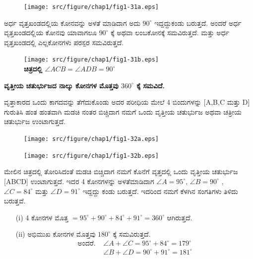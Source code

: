 \begin{itemize}
\newpage  
  
\begin{figure}[H]
\centering
\texttt{[image: src/figure/chap1/fig1-31a.eps]}
\end{figure}
 
 ಅರ್ಧ  ವೃತ್ತಖಂಡದಲ್ಲಿಯ ಕೋನವನ್ನು ಅಳತೆ ಮಾಡಿದಾಗ ಅದು $90^\circ$ ಇದ್ದದ್ದು\break ಕಂಡು ಬರುತ್ತದೆ. ಅಂದರೆ ಅರ್ಧ ವೃತ್ತಖಂಡದಲ್ಲಿಯ ಕೋನವು ಯಾವಾಗಲೂ $90^\circ$ ಕ್ಕೆ ಅಥವಾ ಲಂಬಕೋನಕ್ಕೆ ಸಮವಿರುತ್ತದೆ. ಮತ್ತು ಅರ್ಧ ವೃತ್ತಖಂಡದಲ್ಲಿ ಎಲ್ಲಕೋನಗಳು ಪರಸ್ಪರ ಸಮವಿರುತ್ತದೆ. 
   \begin{figure}[H]
\centering
\texttt{[image: src/figure/chap1/fig1-31b.eps]}\\
\textbf{ಚಿತ್ರದಲ್ಲಿ \quad $\angle ACB = \angle ADB = 90^\circ$}
\end{figure}
  \end{itemize}
   
   \noindent
   \textbf{ವೃತ್ತೀಯ ಚತುರ್ಭುಜದ ನಾಲ್ಕು ಕೋನಗಳ ಮೊತ್ತವು $360^\circ$ ಕ್ಕೆ ಸಮವಿದೆ.}
   
   ವೃತ್ತಾಕಾರದ ಒಂದು ಕಾಗದವನ್ನು ತೆಗೆದುಕೊಂಡು ಅದರ ಪರೀಧಿಯ ಮೇಲೆ 4 ಬಿಂದುಗಳನ್ನು [A,B,C ಮತ್ತು  D] ಗುರುತಿಸಿ ಹಂತ ಹಂತವಾಗಿ ಮಡಚಿ ನಂತರ ಬಿಚ್ಚಿದಾಗ ನಮಗೆ ಒಂದು ವೃತ್ತೀಯ ಚತುರ್ಭುಜ ಅಥವಾ ಚತ್ರೀಯ ಚತುರ್ಭುಜ ಉಂಟಾಗುತ್ತದೆ. 
      \begin{figure}[H]
\centering
\texttt{[image: src/figure/chap1/fig1-32a.eps]}
\end{figure}
      \begin{figure}[H]
\centering
\texttt{[image: src/figure/chap1/fig1-32b.eps]}
\end{figure}
 
 ಮೇಲಿನ ಚಿತ್ರದಲ್ಲಿ ತೋರಿಸಿದಂತೆ ಮಡಚಿ ಬಿಚ್ಚಿದಾಗ ನಮಗೆ ಕೊನೆಗೆ ವೃತ್ತದಲ್ಲಿ ಒಂದು ವೃತ್ತೀಯ ಚತುರ್ಭುಜ [ABCD] ಉಂಟಾಗುತ್ತದೆ. ಇದರ 4 ಕೋನಗಳನ್ನು ಅಳತೆಮಾಡಿದಾಗ  $\angle A = 95^\circ$, $\angle B = 90^\circ$ , $\angle C = 84^\circ$ ಮತ್ತು $\angle D = 91^\circ$ ಇದ್ದದ್ದು ಕಂಡು ಬರುತ್ತದೆ. ಇದರಿಂದ ನಮಗೆ ಕೆಳಗಿನ ಸಂಗತಿಗಳು ತಿಳಿದು ಬರುತ್ತವೆ.
 \begin{itemize}
 \item[(i)] 4 ಕೋನಗಳ ಮೊತ್ತ $= 95^\circ + 90^\circ + 84^\circ + 91^\circ =360^\circ $ ಆಗಿರುತ್ತದೆ. 
 
 \item[(ii)] ಅಭಿಮುಖ ಕೋನಗಳ ಮೊತ್ತವು  $180^\circ$ ಕ್ಕೆ  ಸಮವಿರುತ್ತದೆ. 
 \begin{align*}
 \text{ಅಂದರೆ. } & \angle A + \angle C = 95^\circ + 84^\circ = 179^\circ \\
 & \angle  B + \angle  D = 90^\circ + 91^\circ = 181^\circ
 \end{align*}
 \end{itemize}
 
